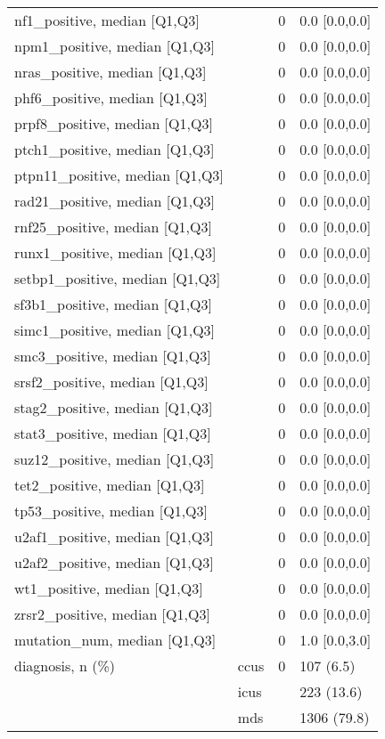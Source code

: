 \begin{tabular}{llll}
nf1\_positive, median [Q1,Q3] &     &      0 &     0.0 [0.0,0.0] \\
npm1\_positive, median [Q1,Q3] &     &      0 &     0.0 [0.0,0.0] \\
nras\_positive, median [Q1,Q3] &     &      0 &     0.0 [0.0,0.0] \\
phf6\_positive, median [Q1,Q3] &     &      0 &     0.0 [0.0,0.0] \\
prpf8\_positive, median [Q1,Q3] &     &      0 &     0.0 [0.0,0.0] \\
ptch1\_positive, median [Q1,Q3] &     &      0 &     0.0 [0.0,0.0] \\
ptpn11\_positive, median [Q1,Q3] &     &      0 &     0.0 [0.0,0.0] \\
rad21\_positive, median [Q1,Q3] &     &      0 &     0.0 [0.0,0.0] \\
rnf25\_positive, median [Q1,Q3] &     &      0 &     0.0 [0.0,0.0] \\
runx1\_positive, median [Q1,Q3] &     &      0 &     0.0 [0.0,0.0] \\
setbp1\_positive, median [Q1,Q3] &     &      0 &     0.0 [0.0,0.0] \\
sf3b1\_positive, median [Q1,Q3] &     &      0 &     0.0 [0.0,0.0] \\
simc1\_positive, median [Q1,Q3] &     &      0 &     0.0 [0.0,0.0] \\
smc3\_positive, median [Q1,Q3] &     &      0 &     0.0 [0.0,0.0] \\
srsf2\_positive, median [Q1,Q3] &     &      0 &     0.0 [0.0,0.0] \\
stag2\_positive, median [Q1,Q3] &     &      0 &     0.0 [0.0,0.0] \\
stat3\_positive, median [Q1,Q3] &     &      0 &     0.0 [0.0,0.0] \\
suz12\_positive, median [Q1,Q3] &     &      0 &     0.0 [0.0,0.0] \\
tet2\_positive, median [Q1,Q3] &     &      0 &     0.0 [0.0,0.0] \\
tp53\_positive, median [Q1,Q3] &     &      0 &     0.0 [0.0,0.0] \\
u2af1\_positive, median [Q1,Q3] &     &      0 &     0.0 [0.0,0.0] \\
u2af2\_positive, median [Q1,Q3] &     &      0 &     0.0 [0.0,0.0] \\
wt1\_positive, median [Q1,Q3] &     &      0 &     0.0 [0.0,0.0] \\
zrsr2\_positive, median [Q1,Q3] &     &      0 &     0.0 [0.0,0.0] \\
mutation\_num, median [Q1,Q3] &     &      0 &     1.0 [0.0,3.0] \\
diagnosis, n (\%) & ccus &      0 &         107 (6.5) \\
                 & icus &        &        223 (13.6) \\
                 & mds &        &       1306 (79.8) \\
\bottomrule
\end{tabular}
